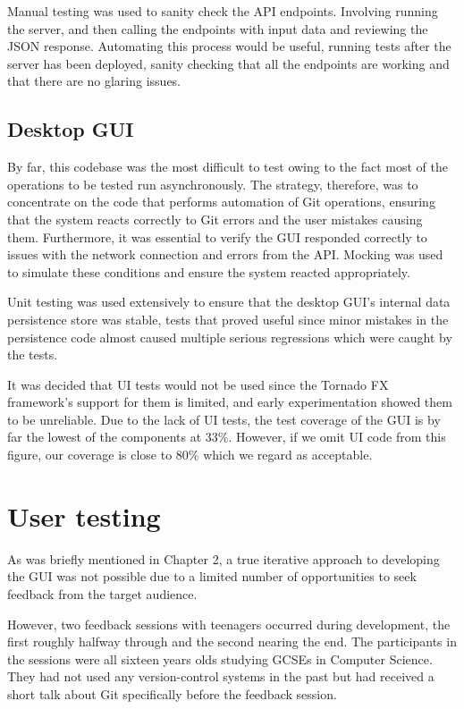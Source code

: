 Manual testing was used to sanity check the API endpoints. Involving running the server, and then calling the endpoints with input data and reviewing the JSON response. Automating this process would be useful, running tests after the server has been deployed, sanity checking that all the endpoints are working and that there are no glaring issues.
 
\subsection{Desktop GUI}

By far, this codebase was the most difficult to test owing to the fact most of the operations to be tested run asynchronously. The strategy, therefore, was to concentrate on the code that performs automation of Git operations, ensuring that the system reacts correctly to Git errors and the user mistakes causing them. Furthermore, it was essential to verify the GUI responded correctly to issues with the network connection and errors from the API. Mocking was used to simulate these conditions and ensure the system reacted appropriately.

Unit testing was used extensively to ensure that the desktop GUI's internal data persistence store was stable, tests that proved useful since minor mistakes in the persistence code almost caused multiple serious regressions which were caught by the tests.

It was decided that UI tests would not be used since the Tornado FX framework's support for them is limited, and early experimentation showed them to be unreliable. Due to the lack of UI tests, the test coverage of the GUI is by far the lowest of the components at 33\%. However, if we omit UI code from this figure, our coverage is close to 80\% which we regard as acceptable.

\section{User testing}\label{sec:user-testing}

As was briefly mentioned in Chapter 2, a true iterative approach to developing the GUI was not possible due to a limited number of opportunities to seek feedback from the target audience. 

However, two feedback sessions with teenagers occurred during development, the first roughly halfway through and the second nearing the end. The participants in the sessions were all sixteen years olds studying GCSEs in Computer Science. They had not used any version-control systems in the past but had received a short talk about Git specifically before the feedback session.

